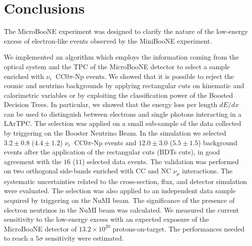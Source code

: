 \chapter{Conclusions}\label{ch:7-conclusions}
The MicroBooNE experiment was designed to clarify the nature of the low-energy excess of electron-like events observed by the MiniBooNE experiment. 

We implemented an algorithm which employs the information coming from the optical system and the TPC of the MicroBooNE detector to select a sample enriched with $\nu_e$~CC0$\pi$-Np events. We showed that it is possible to reject the cosmic and neutrino backgrounds by applying rectangular cuts on kinematic and calorimetric variables or by exploiting the classification power of the Boosted Decision Trees. In particular, we showed that the energy loss per length $dE/dx$ can be used to distinguish between electrons and single photons interacting in a LArTPC. The selection was applied on a small sub-sample of the data collected by triggering on the Booster Neutrino Beam. In the simulation we selected $3.2\pm0.8$ ($4.4\pm1.2$) $\nu_e$~CC0$\pi$-Np events and $12.0\pm3.0$ ($5.5\pm1.5$) background events after the application of the rectangular cuts (BDTs cuts), in good agreement with the $16$ ($11$) selected data events. The validation was performed on two orthogonal side-bands enriched with CC and NC $\nu_{\mu}$ interactions. The systematic uncertainties related to the cross-section, flux, and detector simulation were evaluated. The selection was also applied to an independent data sample acquired by triggering on the NuMI beam. The significance of the presence of electron neutrinos in the NuMI beam was calculated. 
We measured the current sensitivity to the low-energy excess with an expected exposure of the MicroBooNE detector of $13.2\times10^{20}$ protons-on-target. The performances needed to reach a $5\sigma$ sensitivity were estimated.

